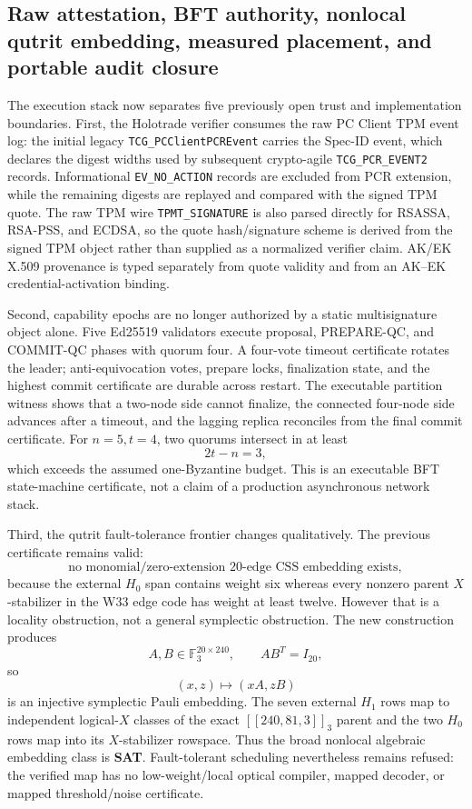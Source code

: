 \subsection{Raw attestation, BFT authority, nonlocal qutrit embedding, measured placement, and portable audit closure}

The execution stack now separates five previously open trust and implementation
boundaries.  First, the Holotrade verifier consumes the raw PC Client TPM event
log: the initial legacy \texttt{TCG\_PCClientPCREvent} carries the Spec-ID event,
which declares the digest widths used by subsequent crypto-agile
\texttt{TCG\_PCR\_EVENT2} records.  Informational \texttt{EV\_NO\_ACTION}
records are excluded from PCR extension, while the remaining digests are replayed
and compared with the signed TPM quote.  The raw TPM wire
\texttt{TPMT\_SIGNATURE} is also parsed directly for RSASSA, RSA-PSS, and ECDSA,
so the quote hash/signature scheme is derived from the signed TPM object rather
than supplied as a normalized verifier claim.  AK/EK X.509 provenance is typed
separately from quote validity and from an AK--EK credential-activation binding.

Second, capability epochs are no longer authorized by a static multisignature
object alone.  Five Ed25519 validators execute proposal, PREPARE-QC, and COMMIT-QC
phases with quorum four.  A four-vote timeout certificate rotates the leader;
anti-equivocation votes, prepare locks, finalization state, and the highest commit
certificate are durable across restart.  The executable partition witness shows
that a two-node side cannot finalize, the connected four-node side advances after
a timeout, and the lagging replica reconciles from the final commit certificate.
For $n=5,t=4$, two quorums intersect in at least
\[
2t-n=3,
\]
which exceeds the assumed one-Byzantine budget.  This is an executable BFT
state-machine certificate, not a claim of a production asynchronous network
stack.

Third, the qutrit fault-tolerance frontier changes qualitatively.  The previous
certificate remains valid:
\[
\boxed{\text{no monomial/zero-extension 20-edge CSS embedding exists}},
\]
because the external $H_0$ span contains weight six whereas every nonzero parent
$X$-stabilizer in the W33 edge code has weight at least twelve.  However that is
a locality obstruction, not a general symplectic obstruction.  The new
construction produces
\[
A,B\in \mathbb F_3^{20\times240},\qquad AB^T=I_{20},
\]
so
\[
(x,z)\longmapsto(xA,zB)
\]
is an injective symplectic Pauli embedding.  The seven external $H_1$ rows map
to independent logical-$X$ classes of the exact $[[240,81,3]]_3$ parent and the
two $H_0$ rows map into its $X$-stabilizer rowspace.  Thus the broad nonlocal
algebraic embedding class is \textbf{SAT}.  Fault-tolerant scheduling nevertheless
remains refused: the verified map has no low-weight/local optical compiler,
mapped decoder, or mapped threshold/noise certificate.

